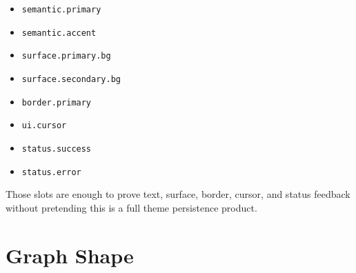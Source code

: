 \begin{itemize}
\tightlist
\item
  \texttt{s\allowbreak{}e\allowbreak{}m\allowbreak{}a\allowbreak{}n\allowbreak{}t\allowbreak{}i\allowbreak{}c\allowbreak{}.\allowbreak{}p\allowbreak{}r\allowbreak{}i\allowbreak{}m\allowbreak{}a\allowbreak{}r\allowbreak{}y}
\item
  \texttt{s\allowbreak{}e\allowbreak{}m\allowbreak{}a\allowbreak{}n\allowbreak{}t\allowbreak{}i\allowbreak{}c\allowbreak{}.\allowbreak{}a\allowbreak{}c\allowbreak{}c\allowbreak{}e\allowbreak{}n\allowbreak{}t}
\item
  \texttt{s\allowbreak{}u\allowbreak{}r\allowbreak{}f\allowbreak{}a\allowbreak{}c\allowbreak{}e\allowbreak{}.\allowbreak{}p\allowbreak{}r\allowbreak{}i\allowbreak{}m\allowbreak{}a\allowbreak{}r\allowbreak{}y\allowbreak{}.\allowbreak{}b\allowbreak{}g}
\item
  \texttt{s\allowbreak{}u\allowbreak{}r\allowbreak{}f\allowbreak{}a\allowbreak{}c\allowbreak{}e\allowbreak{}.\allowbreak{}s\allowbreak{}e\allowbreak{}c\allowbreak{}o\allowbreak{}n\allowbreak{}d\allowbreak{}a\allowbreak{}r\allowbreak{}y\allowbreak{}.\allowbreak{}b\allowbreak{}g}
\item
  \texttt{b\allowbreak{}o\allowbreak{}r\allowbreak{}d\allowbreak{}e\allowbreak{}r\allowbreak{}.\allowbreak{}p\allowbreak{}r\allowbreak{}i\allowbreak{}m\allowbreak{}a\allowbreak{}r\allowbreak{}y}
\item
  \texttt{u\allowbreak{}i\allowbreak{}.\allowbreak{}c\allowbreak{}u\allowbreak{}r\allowbreak{}s\allowbreak{}o\allowbreak{}r}
\item
  \texttt{s\allowbreak{}t\allowbreak{}a\allowbreak{}t\allowbreak{}u\allowbreak{}s\allowbreak{}.\allowbreak{}s\allowbreak{}u\allowbreak{}c\allowbreak{}c\allowbreak{}e\allowbreak{}s\allowbreak{}s}
\item
  \texttt{s\allowbreak{}t\allowbreak{}a\allowbreak{}t\allowbreak{}u\allowbreak{}s\allowbreak{}.\allowbreak{}e\allowbreak{}r\allowbreak{}r\allowbreak{}o\allowbreak{}r}
\end{itemize}

Those slots are enough to prove text, surface, border, cursor, and status feedback without pretending this is a full theme persistence product.

\section{Graph Shape}\label{record-187-graph-shape}

